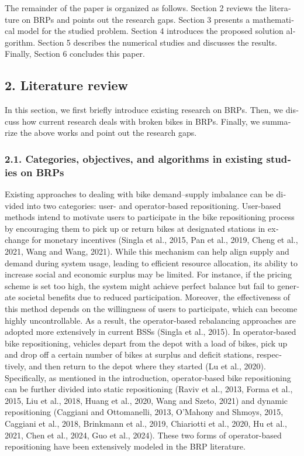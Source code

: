 \documentclass[
  english,
]{article}
\begin{document}
\begin{otherlanguage}{english}
\protect{}\label{p0090}
The remainder of the paper is organized as follows. Section 2 reviews the literature on BRPs and
points out the research gaps. Section 3 presents a mathematical model for the studied problem.
Section 4 introduces the proposed solution algorithm. Section 5 describes the numerical studies and
discusses the results. Finally, Section 6 concludes this paper.

\protect{}\label{s0010}
\subsection{2. Literature review}\label{st030}

\protect{}\label{p0095}
In this section, we first briefly introduce existing research on BRPs. Then, we discuss how current
research deals with broken bikes in BRPs. Finally, we summarize the above works and point out the
research gaps.

\protect{}\label{s0015}
\subsubsection{2.1. Categories, objectives, and algorithms in existing studies on BRPs}\label{st035}

\protect{}\label{p0100}
Existing approaches to dealing with bike demand--supply imbalance can be divided into two
categories: user- and operator-based repositioning. User-based methods intend to motivate users to
participate in the bike repositioning process by encouraging them to pick up or return bikes at
designated stations in exchange for monetary incentives (Singla et al., 2015, Pan et al., 2019,
Cheng et al., 2021, Wang and Wang, 2021). While this mechanism can help align supply and demand
during system usage, leading to efficient resource allocation, its ability to increase social and
economic surplus may be limited. For instance, if the pricing scheme is set too high, the system
might achieve perfect balance but fail to generate societal benefits due to reduced participation.
Moreover, the effectiveness of this method depends on the willingness of users to participate, which
can become highly uncontrollable. As a result, the operator-based rebalancing approaches are adopted
more extensively in current BSSs (Singla et al., 2015). In operator-based bike repositioning,
vehicles depart from the depot with a load of bikes, pick up and drop off a certain number of bikes
at surplus and deficit stations, respectively, and then return to the depot where they started (Lu
et al., 2020). Specifically, as mentioned in the introduction, operator-based bike repositioning can
be further divided into static repositioning (Raviv et al., 2013, Forma et al., 2015, Liu et al.,
2018, Huang et al., 2020, Wang and Szeto, 2021) and dynamic repositioning (Caggiani and Ottomanelli,
2013, O'Mahony and Shmoys, 2015, Caggiani et al., 2018, Brinkmann et al., 2019, Chiariotti et al.,
2020, Hu et al., 2021, Chen et al., 2024, Guo et al., 2024). These two forms of operator-based
repositioning have been extensively modeled in the BRP literature.


\end{otherlanguage}
\end{document}
